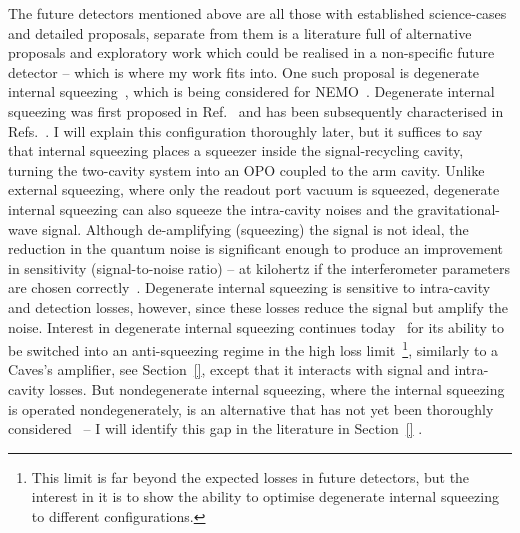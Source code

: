 The future detectors mentioned above are all those with established science-cases and detailed proposals, separate from them is a literature full of alternative proposals and exploratory work which could be realised in a non-specific future detector -- which is where my work fits into. %
One such proposal is degenerate internal squeezing~\cite{Korobko2019,Adya2020}, which is being considered for NEMO~\cite{}. 
Degenerate internal squeezing was first proposed in Ref.~\cite{Korobko2019} and has been subsequently characterised in Refs.~\cite{Adya2020,Korobko?,}. 
I will explain this configuration thoroughly later, but it suffices to say that internal squeezing places a squeezer inside the signal-recycling cavity, turning the two-cavity system into an OPO coupled to the arm cavity. Unlike external squeezing, where only the readout port vacuum is squeezed, degenerate internal squeezing can also squeeze the intra-cavity noises and the gravitational-wave signal. Although de-amplifying (squeezing) the signal is not ideal, the reduction in the quantum noise is significant enough to produce an improvement in sensitivity (signal-to-noise ratio) -- at kilohertz if the interferometer parameters are chosen correctly~\cite{}. Degenerate internal squeezing is sensitive to intra-cavity and detection losses, however, since these losses reduce the signal but amplify the noise. 
Interest in degenerate internal squeezing continues today~\cite{KorobkoTalk} for its ability to be switched into an anti-squeezing regime in the high loss limit~\footnote{This limit is far beyond the expected losses in future detectors, but the interest in it is to show the ability to optimise degenerate internal squeezing to different configurations.}, similarly to a Caves's amplifier, see Section~\ref{}, except that it interacts with signal and intra-cavity losses. 
But nondegenerate internal squeezing, where the internal squeezing is operated nondegenerately, is an alternative that has not yet been thoroughly considered~\cite{} -- I will identify this gap in the literature in Section~\ref{} . 

